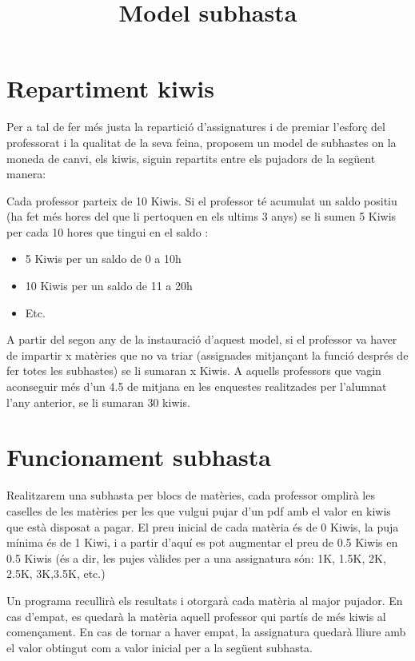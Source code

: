 \documentclass[a4paper,12pt]{article}
\title{Model subhasta}
\author{ }
\date{}
\begin{document}
\maketitle

\section{Repartiment kiwis}
Per a tal de fer més justa la repartició d'assignatures i de premiar l'esforç del professorat i la qualitat de la seva feina, proposem un model de subhastes on la moneda de canvi, els kiwis, siguin repartits entre els pujadors de la següent manera:

Cada professor parteix de 10 Kiwis.
Si el professor té acumulat un saldo positiu (ha fet més hores del que li pertoquen en els ultims 3 anys) se li sumen 5 Kiwis per cada 10 hores que tingui en el saldo : 
\begin{itemize}
    \item 5 Kiwis per un saldo de 0 a 10h
    \item 10 Kiwis per un saldo de 11 a 20h
    \item  Etc.
\end{itemize}

A partir del segon any de la instauració d'aquest model, si el professor va haver de impartir x matèries que no va triar (assignades mitjançant la funció després de fer totes les subhastes) se li sumaran x Kiwis. A aquells professors que vagin aconseguir més d'un 4.5 de mitjana en les enquestes realitzades per l'alumnat l'any anterior,  se li sumaran 30 kiwis. 

\section{Funcionament subhasta}

Realitzarem una subhasta per blocs de matèries, cada professor omplirà les caselles de les matèries per les que vulgui pujar d'un pdf amb el valor en kiwis que està disposat  a pagar. El preu inicial de cada matèria és de 0 Kiwis, la puja mínima és de 1 Kiwi, i a partir d'aquí es pot augmentar el preu de 0.5 Kiwis en 0.5 Kiwis (és a dir, les pujes vàlides per a una assignatura són: 1K, 1.5K, 2K, 2.5K, 3K,3.5K, etc.)

Un programa recullirà els resultats i otorgarà cada matèria al major pujador. En cas d'empat, es quedarà la matèria aquell professor qui partís de més kiwis al començament. En cas de tornar a haver empat, la assignatura quedarà lliure amb el valor obtingut com a valor inicial per a la següent subhasta.
\end{document}
